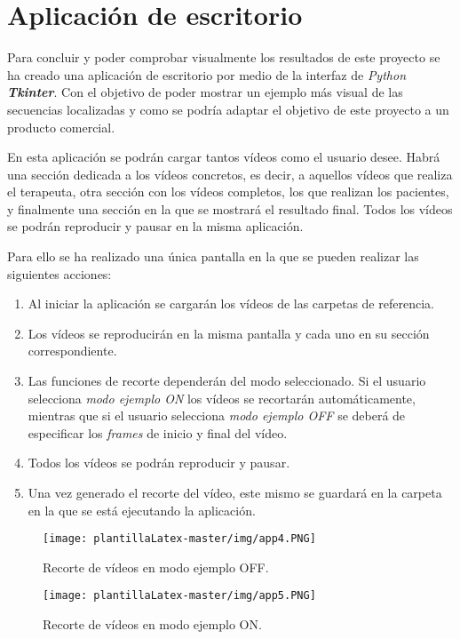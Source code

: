 \section{Aplicación de escritorio} \label{cap:app}

Para concluir y poder comprobar visualmente los resultados de este proyecto se ha creado una aplicación de escritorio por medio de la interfaz de \textit{Python} \textit{\textbf{Tkinter}}. Con el objetivo de poder mostrar un ejemplo más visual de las secuencias localizadas y como se podría adaptar el objetivo de este proyecto a un producto comercial. 

En esta aplicación se podrán cargar tantos vídeos como el usuario desee. Habrá una sección dedicada a los vídeos concretos, es decir, a aquellos vídeos que realiza el terapeuta, otra sección con los vídeos completos, los que realizan los pacientes, y finalmente una sección en la que se mostrará el resultado final. Todos los vídeos se podrán reproducir y pausar en la misma aplicación. 

Para ello se ha realizado una única pantalla en la que se pueden realizar las siguientes acciones:
\begin{enumerate}
    \item Al iniciar la aplicación se cargarán los vídeos de las carpetas de referencia.
    \item Los vídeos se reproducirán en la misma pantalla y cada uno en su sección correspondiente.
    \item Las funciones de recorte dependerán del modo seleccionado. Si el usuario selecciona \textit{modo ejemplo ON} los vídeos se recortarán automáticamente, mientras que si el usuario selecciona \textit{modo ejemplo OFF} se deberá de especificar los \textit{frames} de inicio y final del vídeo.
    \item Todos los vídeos se podrán reproducir y pausar.
    \item Una vez generado el recorte del vídeo, este mismo se guardará en la carpeta en la que se está ejecutando la aplicación.
\end{enumerate}

\begin{figure}
    \centering
    \texttt{[image: plantillaLatex-master/img/app4.PNG]}
    \caption{Recorte de vídeos en modo ejemplo OFF.}
    \label{fig:app4_}
\end{figure}

\begin{figure}
    \centering
    \texttt{[image: plantillaLatex-master/img/app5.PNG]}
    \caption{Recorte de vídeos en modo ejemplo ON.}
    \label{fig:app5_}
\end{figure}

